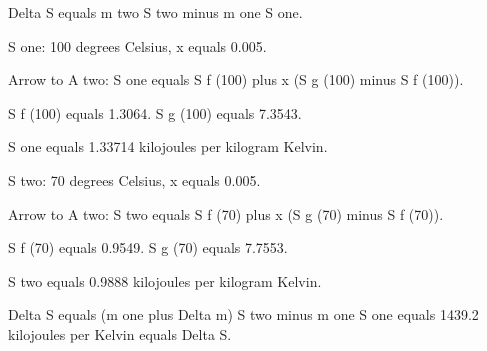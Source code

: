 Delta S equals m two S two minus m one S one.  

S one: 100 degrees Celsius, x equals 0.005.  

Arrow to A two: S one equals S f (100) plus x (S g (100) minus S f (100)).  

S f (100) equals 1.3064.  
S g (100) equals 7.3543.  

S one equals 1.33714 kilojoules per kilogram Kelvin.  

S two: 70 degrees Celsius, x equals 0.005.  

Arrow to A two: S two equals S f (70) plus x (S g (70) minus S f (70)).  

S f (70) equals 0.9549.  
S g (70) equals 7.7553.  

S two equals 0.9888 kilojoules per kilogram Kelvin.  

Delta S equals (m one plus Delta m) S two minus m one S one equals 1439.2 kilojoules per Kelvin equals Delta S.